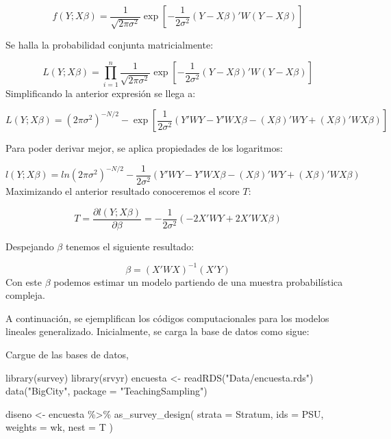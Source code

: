 \documentclass[
  12pt,
]{book}
\newenvironment{Shaded}{\begin{snugshade}}{\end{snugshade}}
\newcommand{\AttributeTok}[1]{\textcolor[rgb]{0.77,0.63,0.00}{#1}}
\newcommand{\FunctionTok}[1]{\textcolor[rgb]{0.00,0.00,0.00}{#1}}
\newcommand{\NormalTok}[1]{#1}
\newcommand{\OtherTok}[1]{\textcolor[rgb]{0.56,0.35,0.01}{#1}}
\newcommand{\SpecialCharTok}[1]{\textcolor[rgb]{0.00,0.00,0.00}{#1}}
\newcommand{\StringTok}[1]{\textcolor[rgb]{0.31,0.60,0.02}{#1}}
\begin{document}
\[
f(Y;X\beta)=\dfrac{1}{\sqrt{2\pi\sigma^{2}}}\exp\left[-\dfrac{1}{2\sigma^{2}}(Y-X\beta)'W(Y-X\beta)\right]
\]

Se halla la probabilidad conjunta matricialmente:

\[
L(Y;X\beta)=\prod_{i=1}^{n}\dfrac{1}{\sqrt{2\pi\sigma^{2}}}\exp\left[-\dfrac{1}{2\sigma^{2}}(Y-X\beta)'W(Y-X\beta)\right]
\]
Simplificando la anterior expresión se llega a:

\[
L(Y;X\beta)=(2\pi\sigma^{2})^{-N/2}-\exp\left[\dfrac{1}{2\sigma^{2}}(Y'WY-Y'WX\beta-(X\beta)'WY+(X\beta)'WX\beta)\right]
\]

Para poder derivar mejor, se aplica propiedades de los logaritmos:

\[
l(Y;X\beta)=ln(2\pi\sigma^{2})^{-N/2}-\dfrac{1}{2\sigma^{2}}(Y'WY-Y'WX\beta-(X\beta)'WY+(X\beta)'WX\beta)
\]
Maximizando el anterior resultado conoceremos el score \(T\):

\[
T=\dfrac{\partial l(Y;X\beta)}{\partial\beta}=-\dfrac{1}{2\sigma^{2}}(-2X'WY+2X'WX\beta)
\]

Despejando \(\beta\) tenemos el siguiente resultado:

\[
\beta=(X'WX)^{-1}(X'Y)
\]
Con este \(\beta\) podemos estimar un modelo partiendo de una muestra probabilística compleja.

A continuación, se ejemplifican los códigos computacionales para los modelos lineales generalizado. Inicialmente, se carga la base de datos como sigue:

Cargue de las bases de datos,

\begin{Shaded}
\begin{Highlighting}[]
\FunctionTok{library}\NormalTok{(survey)}
\FunctionTok{library}\NormalTok{(srvyr)}
\NormalTok{encuesta }\OtherTok{\textless{}{-}} \FunctionTok{readRDS}\NormalTok{(}\StringTok{"Data/encuesta.rds"}\NormalTok{)}
\FunctionTok{data}\NormalTok{(}\StringTok{"BigCity"}\NormalTok{, }\AttributeTok{package =} \StringTok{"TeachingSampling"}\NormalTok{)}
\end{Highlighting}
\end{Shaded}

\begin{Shaded}
\begin{Highlighting}[]
\NormalTok{diseno }\OtherTok{\textless{}{-}}\NormalTok{ encuesta }\SpecialCharTok{\%\textgreater{}\%}
  \FunctionTok{as\_survey\_design}\NormalTok{(}
    \AttributeTok{strata =}\NormalTok{ Stratum,}
    \AttributeTok{ids =}\NormalTok{ PSU,}
    \AttributeTok{weights =}\NormalTok{ wk,}
    \AttributeTok{nest =}\NormalTok{ T}
\NormalTok{  )}
\end{Highlighting}
\end{Shaded}
\end{document}
